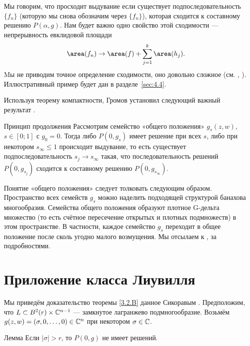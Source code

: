 Мы говорим, что просходит выдувание если существует подпоследовательность $\{f_n\}$ (которую мы снова обозначим через $\{f_n\}$), которая сходится к составному решению $P(\alpha,g)$.
Нам будет важно одно свойство этой сходимости — непрерывность
евклидовой площади
\[\area (f_n)
\to
\area(f)
+\sum_{j=1}^k\area (h_j).\]
Mы не приводим точное определение сходимости, оно довольно сложное (см. \cite{G1}, \cite{AL}).
Иллюстративный пример будет дан в разделе~\ref{sec:4.4}.

Используя теорему компактности, Громов установил следующий важный результат \cite{G1}.

\begin{thm*}{Принцип продолжения}
Рассмотрим семейство «общего положения» $g_s (z, w)$, $s \in [0;1]$ с
$g_0 = 0$. 
Тогда либо $P (0, g_s)$ имеет решение при всех $s$, либо при некотором $s_\infty \le 1$ происходит выдувание, то есть существует
подпоследовательность  $s_j \to s_\infty$ такая, что
последовательность решений $P(0,g_{s_j})$ сходится к составному решению $P
(0, g_{s_\infty})$. 
\end{thm*}

Понятие «общего положения» следует толковать следующим образом.
Пространство всех семейств $g_s$ можно наделить подходящей структурой
банахова многообразия. 
Семейства общего положения образуют плотное G-дельта множество (то есть счётное пересечение открытых и плотных подмножеств) в этом пространстве.
В частности, каждое семейство $g_s$ переходит в общее положение после
сколь угодно малого возмущения. 
Мы отсылаем к \cite{G1}, \cite{AL} за подробностями.

\section{Приложение класса Лиувилля}

Мы приведём доказательство теоремы \ref{3.2.B} данное Сикоравым \cite{S1}.
Предположим, что $L \subset B^2 (r) \times \mathbb{C}^{n-1}$ — замкнутое
лагранжево подмногообразие. 
Возьмём $g (z, w) = (\sigma, 0 ,\dots, 0) \in \mathbb{C}^n$ при некотором $\sigma \in \mathbb{C}$.

\begin{thm}{Лемма}\label{4.3.A}
Если $| \sigma | > r$, то $P (0, g)$ не имеет решений.
\end{thm}


